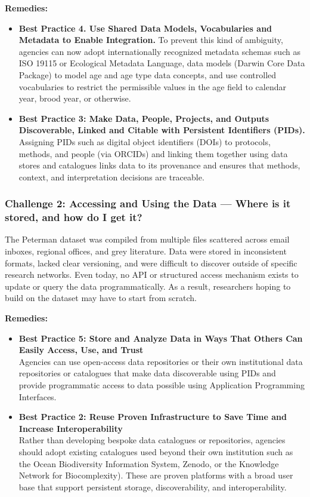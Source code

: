 \documentclass[
  letterpaper,
  DIV=11,
  numbers=noendperiod]{scrartcl}
\begin{document}
\textbf{Remedies:}

\begin{itemize}
\item
  \textbf{Best Practice 4. Use Shared Data Models, Vocabularies and
  Metadata to Enable Integration.} To prevent this kind of ambiguity,
  agencies can now adopt internationally recognized metadata schemas
  such as ISO 19115 or Ecological Metadata Language, data models (Darwin
  Core Data Package) to model age and age type data concepts, and use
  controlled vocabularies to restrict the permissible values in the age
  field to calendar year, brood year, or otherwise.
\item
  \textbf{Best Practice 3: Make Data, People, Projects, and Outputs
  Discoverable, Linked and Citable with Persistent Identifiers (PIDs).}
  Assigning PIDs such as digital object identifiers (DOIs) to protocols,
  methods, and people (via ORCIDs) and linking them together using data
  stores and catalogues links data to its provenance and ensures that
  methods, context, and interpretation decisions are traceable.
\end{itemize}

\subsubsection{Challenge 2: Accessing and Using the Data --- Where is it
stored, and how do I get
it?}\label{challenge-2-accessing-and-using-the-data-where-is-it-stored-and-how-do-i-get-it}

The Peterman dataset was compiled from multiple files scattered across
email inboxes, regional offices, and grey literature. Data were stored
in inconsistent formats, lacked clear versioning, and were difficult to
discover outside of specific research networks. Even today, no API or
structured access mechanism exists to update or query the data
programmatically. As a result, researchers hoping to build on the
dataset may have to start from scratch.

\textbf{Remedies:}

\begin{itemize}
\item
  \textbf{Best Practice 5: Store and Analyze Data in Ways That Others
  Can Easily Access, Use, and Trust}\\
  Agencies can use open-access data repositories or their own
  institutional data repositories or catalogues that make data
  discoverable using PIDs and provide programmatic access to data
  possible using Application Programming Interfaces.
\item
  \textbf{Best Practice 2: Reuse Proven Infrastructure to Save Time and
  Increase Interoperability}\\
  Rather than developing bespoke data catalogues or repositories,
  agencies should adopt existing catalogues used beyond their own
  institution such as the Ocean Biodiversity Information System, Zenodo,
  or the Knowledge Network for Biocomplexity). These are proven
  platforms with a broad user base that support persistent storage,
  discoverability, and interoperability.
\end{itemize}
\end{document}
